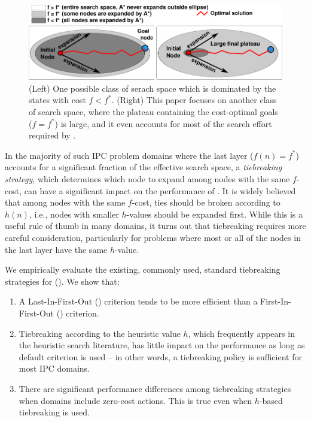 \begin{figure}[htbp]
  \centering
  \includegraphics{img/astar/plateau-0.pdf}
 \caption{(Left) One possible class of serach space which is dominated by the states with cost $f<f^*$. (Right) This paper focuses on another class of search space, where the plateau containing the cost-optimal goals ($f=f^*$) is large, and it even accounts for most of the search effort required by \astar. %
  }
 \label{fig:plateau-0}
\end{figure}

In the majority of such IPC problem domains where
the last layer ($f(n)=f^*$) accounts for a significant fraction of the effective search space, a
\emph{tiebreaking strategy}, which determines which node to expand among nodes with the same $f$-cost,
can have a significant impact on the performance of \astar.
It is widely believed that among nodes with the same $f$-cost,
ties should be broken according to $h(n)$, i.e.,
nodes with smaller $h$-values should be expanded first.  While this is a
useful rule of thumb in many domains, it turns out that tiebreaking
requires more careful consideration, particularly for problems where
most or all of the nodes in the last layer have the same $h$-value.

We empirically evaluate the existing, commonly used, standard
tiebreaking strategies for \astar ().
We show that:

\begin{enumerate}
 \item A Last-In-First-Out (\lifo) criterion tends to be more efficient
       than a First-In-First-Out (\fifo) criterion.
 \item Tiebreaking according to the heuristic value $h$, which
       frequently appears in the heuristic search literature, has little
       impact on the performance as long as \lifo default criterion is used 
       --  in other words, a \lifo tiebreaking policy is sufficient for most IPC domains.
 \item There are significant performance differences among tiebreaking strategies
       when domains include zero-cost actions. This is true even when $h$-based tiebreaking is used.
\end{enumerate}

